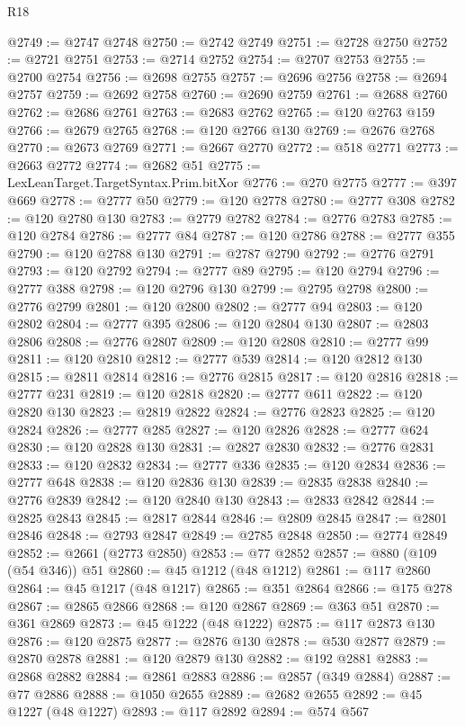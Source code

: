 \begin{lexlean}{R18}
\begin{coremodule}
@2749 := @2747 @2748
@2750 := @2742 @2749
@2751 := @2728 @2750
@2752 := @2721 @2751
@2753 := @2714 @2752
@2754 := @2707 @2753
@2755 := @2700 @2754
@2756 := @2698 @2755
@2757 := @2696 @2756
@2758 := @2694 @2757
@2759 := @2692 @2758
@2760 := @2690 @2759
@2761 := @2688 @2760
@2762 := @2686 @2761
@2763 := @2683 @2762
@2765 := @120 @2763 @159
@2766 := @2679 @2765
@2768 := @120 @2766 @130
@2769 := @2676 @2768
@2770 := @2673 @2769
@2771 := @2667 @2770
@2772 := @518 @2771
@2773 := @2663 @2772
@2774 := @2682 @51
@2775 := LexLeanTarget.TargetSyntax.Prim.bitXor
@2776 := @270 @2775
@2777 := @397 @669
@2778 := @2777 @50
@2779 := @120 @2778
@2780 := @2777 @308
@2782 := @120 @2780 @130
@2783 := @2779 @2782
@2784 := @2776 @2783
@2785 := @120 @2784
@2786 := @2777 @84
@2787 := @120 @2786
@2788 := @2777 @355
@2790 := @120 @2788 @130
@2791 := @2787 @2790
@2792 := @2776 @2791
@2793 := @120 @2792
@2794 := @2777 @89
@2795 := @120 @2794
@2796 := @2777 @388
@2798 := @120 @2796 @130
@2799 := @2795 @2798
@2800 := @2776 @2799
@2801 := @120 @2800
@2802 := @2777 @94
@2803 := @120 @2802
@2804 := @2777 @395
@2806 := @120 @2804 @130
@2807 := @2803 @2806
@2808 := @2776 @2807
@2809 := @120 @2808
@2810 := @2777 @99
@2811 := @120 @2810
@2812 := @2777 @539
@2814 := @120 @2812 @130
@2815 := @2811 @2814
@2816 := @2776 @2815
@2817 := @120 @2816
@2818 := @2777 @231
@2819 := @120 @2818
@2820 := @2777 @611
@2822 := @120 @2820 @130
@2823 := @2819 @2822
@2824 := @2776 @2823
@2825 := @120 @2824
@2826 := @2777 @285
@2827 := @120 @2826
@2828 := @2777 @624
@2830 := @120 @2828 @130
@2831 := @2827 @2830
@2832 := @2776 @2831
@2833 := @120 @2832
@2834 := @2777 @336
@2835 := @120 @2834
@2836 := @2777 @648
@2838 := @120 @2836 @130
@2839 := @2835 @2838
@2840 := @2776 @2839
@2842 := @120 @2840 @130
@2843 := @2833 @2842
@2844 := @2825 @2843
@2845 := @2817 @2844
@2846 := @2809 @2845
@2847 := @2801 @2846
@2848 := @2793 @2847
@2849 := @2785 @2848
@2850 := @2774 @2849
@2852 := @2661 (@2773 @2850)
@2853 := @77 @2852
@2857 := @880 (@109 (@54 @346)) @51
@2860 := @45 @1212 (@48 @1212)
@2861 := @117 @2860
@2864 := @45 @1217 (@48 @1217)
@2865 := @351 @2864
@2866 := @175 @278
@2867 := @2865 @2866
@2868 := @120 @2867
@2869 := @363 @51
@2870 := @361 @2869
@2873 := @45 @1222 (@48 @1222)
@2875 := @117 @2873 @130
@2876 := @120 @2875
@2877 := @2876 @130
@2878 := @530 @2877
@2879 := @2870 @2878
@2881 := @120 @2879 @130
@2882 := @192 @2881
@2883 := @2868 @2882
@2884 := @2861 @2883
@2886 := @2857 (@349 @2884)
@2887 := @77 @2886
@2888 := @1050 @2655
@2889 := @2682 @2655
@2892 := @45 @1227 (@48 @1227)
@2893 := @117 @2892
@2894 := @574 @567

\end{coremodule}
\end{lexlean}
